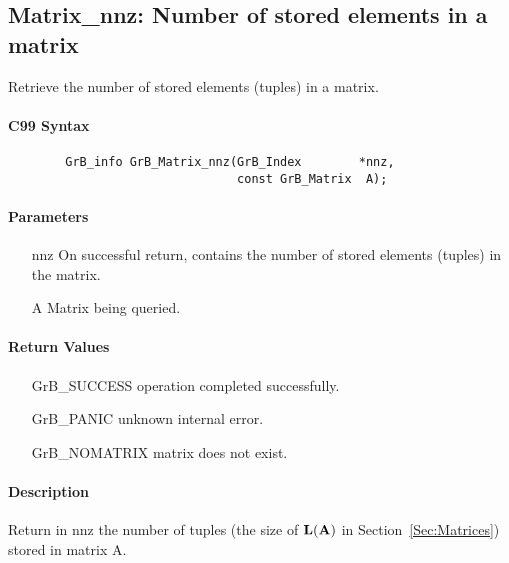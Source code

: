 \subsection{{\sf Matrix\_nnz}: Number of stored elements in a matrix}

Retrieve the number of stored elements (tuples) in a matrix.

\paragraph{C99 Syntax}

\begin{verbatim}
        GrB_info GrB_Matrix_nnz(GrB_Index        *nnz,
                                const GrB_Matrix  A);
\end{verbatim}

\paragraph{Parameters}

\begin{itemize}[leftmargin=1.1in]
    \item[{\sf nnz}] On successful return, contains the number of stored elements (tuples) 
    in the matrix.
    \item[{\sf A}] Matrix being queried.
\end{itemize}

\paragraph{Return Values}

\begin{itemize}[leftmargin=2.1in]
\item[{\sf GrB\_SUCCESS}]   operation completed successfully.
\item[{\sf GrB\_PANIC}]     unknown internal error.
\item[{\sf GrB\_NOMATRIX}]  matrix does not exist.
\end{itemize}

\paragraph{Description}

Return in {\sf nnz} the number of tuples (the size of $\bold{L}({\bf A})$
in Section~\ref{Sec:Matrices}) stored in matrix {\sf A}.
